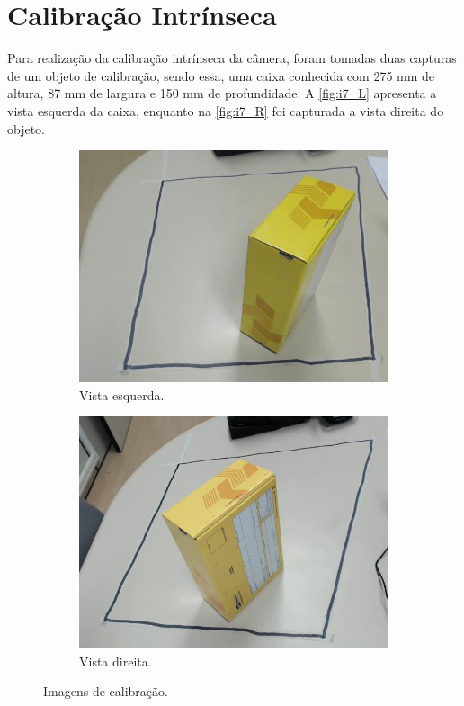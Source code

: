 
\section{Calibração Intrínseca}

Para realização da calibração intrínseca da câmera, foram tomadas duas capturas de um objeto de calibração, sendo essa, uma caixa conhecida com 275 mm de altura, 87 mm de largura e 150 mm de profundidade. A \autoref{fig:i7_L} apresenta a vista esquerda da caixa, enquanto na \autoref{fig:i7_R} foi capturada a vista direita do objeto.

\begin{figure}[H]
	\centering
	\begin{subfigure}[H]{0.49\textwidth}
		\includegraphics[width = \textwidth]{../../data/i7_L.jpg}
		\caption{Vista esquerda.}
		\label{fig:i7_L}
	\end{subfigure}
	\begin{subfigure}[H]{0.49\textwidth}
		\centering
		\includegraphics[width = \textwidth]{../../data/i7_R.jpg}
		\caption{Vista direita.}
		\label{fig:i7_R}
	\end{subfigure}
	\caption{Imagens de calibração.}
\end{figure}

